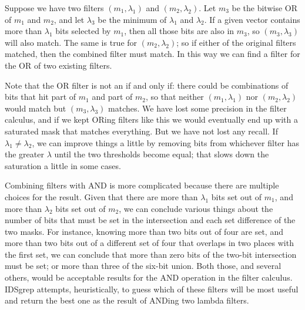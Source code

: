 \documentclass[twocolumn]{report}
\begin{document}
Suppose we have two filters $(m_1,\lambda_1)$ and $(m_2,\lambda_2)$.  Let
$m_3$ be the bitwise OR of $m_1$ and $m_2$, and let $\lambda_3$ be the
minimum of $\lambda_1$ and $\lambda_2$.  If a given vector contains more
than $\lambda_1$ bits selected by $m_1$, then all those bits are also in
$m_3$, so $(m_3,\lambda_3)$ will also match.  The same is true for
$(m_2,\lambda_2)$; so if either of the original filters matched, then the
combined filter must match.  In this way we can find a filter for the OR of
two existing filters.

Note that the OR filter is not an if and only if: there could
be combinations of bits that hit part of $m_1$ and part of $m_2$, so that
neither $(m_1,\lambda_1)$ nor $(m_2,\lambda_2)$ would match but
$(m_3,\lambda_3)$ matches.  We have lost some precision in the filter
calculus, and if we kept ORing filters like this we would eventually end up
with a saturated mask that matches everything.  But we have not lost any
recall.  If $\lambda_1\ne\lambda_2$, we can improve things a
little by removing bits from whichever filter has the greater $\lambda$
until the two thresholds become equal; that slows down the saturation a
little in some cases.

Combining filters with AND is more complicated because there are multiple
choices for the result.  Given that there are more than $\lambda_1$ bits set
out of $m_1$, and more than $\lambda_2$ bits set out of $m_2$, we can
conclude various things about the number of bits that must be set in the
intersection and each set difference of the two masks.  For instance,
knowing more than two bits out of four are set, and more than two bits out
of a different set of four that overlaps in two places with the first set,
we can conclude that more than zero bits of the two-bit intersection must be
set; or more than three of the six-bit union.  Both those, and several
others, would be acceptable results for the AND operation in the filter
calculus.  IDSgrep attempts, heuristically, to guess which of these filters
will be most useful and return the best one as the result of ANDing two
lambda filters.
\end{document}
